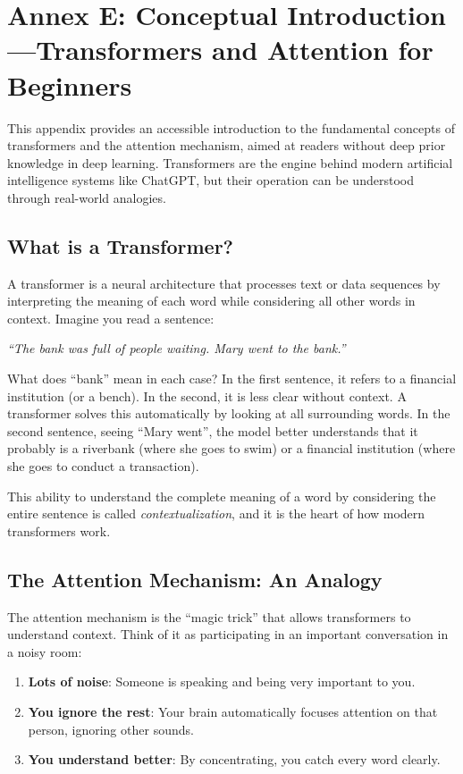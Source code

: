 \documentclass[11pt,a4paper]{article}
\begin{document}
\section{Annex E: Conceptual Introduction---Transformers and Attention for Beginners}
\label{sec:annex-tutorial}

This appendix provides an accessible introduction to the fundamental concepts of transformers and the attention mechanism, aimed at readers without deep prior knowledge in deep learning. Transformers are the engine behind modern artificial intelligence systems like ChatGPT, but their operation can be understood through real-world analogies.

\subsection{What is a Transformer?}

A transformer is a neural architecture that processes text or data sequences by interpreting the meaning of each word while considering all other words in context. Imagine you read a sentence:

\begin{center}
\textit{``The bank was full of people waiting. Mary went to the bank.''}
\end{center}

What does ``bank'' mean in each case? In the first sentence, it refers to a financial institution (or a bench). In the second, it is less clear without context. A transformer solves this automatically by looking at all surrounding words. In the second sentence, seeing ``Mary went'', the model better understands that it probably is a riverbank (where she goes to swim) or a financial institution (where she goes to conduct a transaction).

This ability to understand the complete meaning of a word by considering the entire sentence is called \emph{contextualization}, and it is the heart of how modern transformers work.

\subsection{The Attention Mechanism: An Analogy}

The attention mechanism is the ``magic trick'' that allows transformers to understand context. Think of it as participating in an important conversation in a noisy room:

\begin{enumerate}[leftmargin=*]
    \item \textbf{Lots of noise}: Someone is speaking and being very important to you.
    \item \textbf{You ignore the rest}: Your brain automatically focuses attention on that person, ignoring other sounds.
    \item \textbf{You understand better}: By concentrating, you catch every word clearly.
\end{enumerate}
\end{document}
